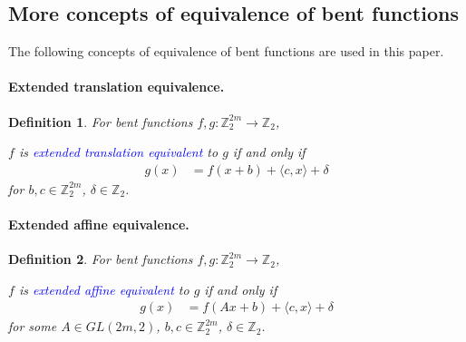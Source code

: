 \documentclass[12pt,a4paper]{article}
\newcommand{\mb}[1]{\mathbb{#1}}
\newcommand{\Z}{\mb{Z}}
\newcommand{\To}{\rightarrow}
\newcommand{\Emph}[1]{\emph{\textcolor{blue}{#1}}}
\newtheorem{Definition}{Definition}
\begin{document}
\subsection{More concepts of equivalence of bent functions}
The following concepts of equivalence of bent functions are used in this paper.

\paragraph*{Extended translation equivalence.}

\begin{Definition}
For bent functions $f,g : \Z_2^{2m} \To \Z_2$,

$f$ is \Emph{extended translation equivalent} to $g$ if and only if
\begin{align*}
g(x) &= f(x + b) + \langle c, x \rangle + \delta
\end{align*}
for $b, c \in \Z_2^{2m}$, $\delta \in \Z_2$.
\end{Definition}

\paragraph*{Extended affine equivalence.}

\begin{Definition}
For bent functions $f,g : \Z_2^{2m} \To \Z_2$,

$f$ is \Emph{extended affine equivalent} \cite[Section 1.4]{Tok15bent} to $g$ if and only if
\begin{align*}
g(x) &= f(A x + b) + \langle c, x \rangle + \delta
\end{align*}
for some $A \in GL(2m,2)$, $b, c \in \Z_2^{2m}$, $\delta \in \Z_2$.
\end{Definition}
~

\end{document}

